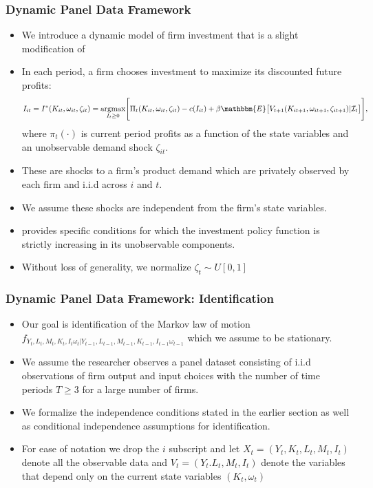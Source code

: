 \documentclass{beamer}
\begin{document}
\begin{frame}
\frametitle{Dynamic Panel Data Framework}
\begin{itemize}
	\item We introduce a dynamic model of firm investment that is a slight modification of \cite{Ericson1995}
	\item In each period, a firm chooses investment to maximize its discounted future profits:
	\scriptsize
		\begin{equation} \label{valuefn}
		I_{it}=I^{*}(K_{it}, \omega_{it}, \zeta_{it})=\underset{I_{t}\geq 0}{\operatorname{argmax}}\Bigg[\Pi_{t}(K_{it}, \omega_{it}, \zeta_{it})-c(I_{it})+\beta\mathbbm{E}\big[V_{t+1}(K_{it+1}, \omega_{it+1}, \zeta_{it+1})|\mathcal{I}_{t}\big]\Bigg],
		\end{equation}
		\normalsize
	where $\pi_{t}(\cdot)$ is current period profits as a function of the state variables and an unobservable demand shock $\zeta_{it}$. 
	\item These are shocks to a firm's product demand which are privately observed by each firm and i.i.d across $i$ and $t$. 
	\item We assume these shocks are independent from the firm's state variables.  
	\item \cite{Pakesa} provides specific conditions for which the investment policy function is strictly increasing in its unobservable components.
	\item  Without loss of generality, we normalize $\zeta_{t}\sim U[0,1]$
	\end{itemize}
\end{frame}


\begin{frame}
\frametitle{Dynamic Panel Data Framework: Identification}
\begin{itemize}
	\item Our goal is identification of the Markov law of motion $f_{Y_{t}, L_{t}, M_{t}, K_{t}, I_{t} \omega_{t}|Y_{t-1}, L_{t-1}, M_{t-1}, K_{t-1}, I_{t-1} \omega_{t-1}}$ which we assume to be stationary.
	\item We assume the researcher observes a panel dataset consisting of i.i.d observations of firm output and input choices with the number of time periods $T\geq 3$ for a large number of firms.
	\item We formalize the independence conditions stated in the earlier section as well as conditional independence assumptions for identification.
	\item For ease of notation we drop the $i$ subscript and let $X_{t}=(Y_{t}, K_{t}, L_{t}, M_{t}, I_{t})$
	denote all the observable data and $V_{t}=(Y_{t}. L_{t}, M_{t}, I_{t})$ denote the variables that depend only on the current state variables $(K_{t}, \omega_{t})$
	\end{itemize}
\end{frame}
\end{document}
